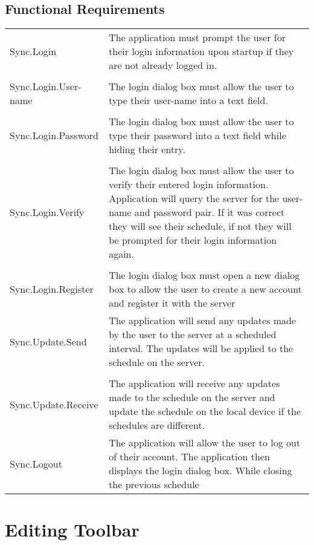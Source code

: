 \documentclass{scrreprt}
\begin{document}
\subsection{Functional Requirements}
\begin{center}
    \begin{longtable}{ | p{6cm} | p{9cm} | }
    \hline
    Sync.Login & The application must prompt the user for their login information
    upon startup if they are not already logged in.\\
    & \\
    Sync.Login.User-name & The login dialog box must allow the user to type their
    user-name into a text field.\\
    & \\
    Sync.Login.Password & The login dialog box must allow the user to type their
    password into a text field while hiding their entry.\\
    & \\
    Sync.Login.Verify & The login dialog box must allow the user to verify their
    entered login information. Application will query the server for the
    user-name and password pair. If it was correct they will see their schedule,
    if not they will be prompted for their login information again.\\
    & \\
    Sync.Login.Register & The login dialog box must open a new dialog box to allow the
    user to create a new account and register it with the server\\
    \hline
    Sync.Update.Send & The application will send any updates made by the user to the
    server at a scheduled interval. The updates will be applied to the schedule on the server.\\
    & \\
    Sync.Update.Receive & The application will receive any updates made to the schedule
    on the server and update the schedule on the local device if the schedules are different.\\
    \hline
    Sync.Logout & The application will allow the user to log out of their account. The
    application then displays the login dialog box. While closing the previous schedule\\
    \hline
    \end{longtable}
\end{center}

\section{Editing Toolbar}
\end{document}
